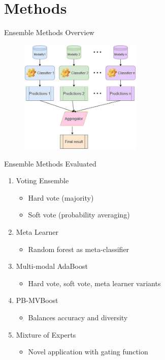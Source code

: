 \documentclass{beamer}
\begin{document}
\section{Methods}

\begin{frame}{Ensemble Methods Overview}
  \begin{figure}[H]
    \centering
    \includegraphics[width=0.52\textwidth]{assets/classifier.png}
  \end{figure}
\end{frame}

\begin{frame}{Ensemble Methods Evaluated}
\begin{enumerate}
\item \alert{Voting Ensemble}
  \begin{itemize}
  \item Hard vote (majority)
  \item Soft vote (probability averaging)
  \end{itemize}
\item \alert{Meta Learner}
  \begin{itemize}
  \item Random forest as meta-classifier
  \end{itemize}
\item \alert{Multi-modal AdaBoost}
  \begin{itemize}
  \item Hard vote, soft vote, meta learner variants
  \end{itemize}
\item \alert{PB-MVBoost}
  \begin{itemize}
  \item Balances accuracy and diversity
  \end{itemize}
\item \alert{Mixture of Experts}
  \begin{itemize}
  \item Novel application with gating function
  \end{itemize}
\end{enumerate}
\end{frame}
\end{document}
